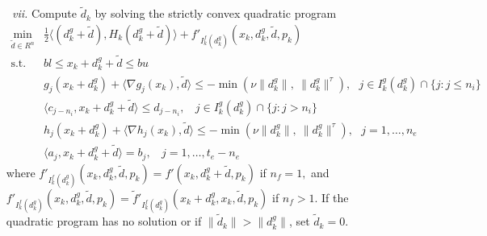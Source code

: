 \begin{itemize}
\item[\it ~vii.] 
Compute $\tilde d_{k}$ by solving the strictly convex 
quadratic program
\smallskip
$$  \begin{array}{cl} \min\limits_{\tilde d \in R^n} &  \frac{1}{2}
                  \langle (d_k^g+\tilde d),H_{k}(d^g_k+\tilde d)\rangle 
                 +f'_{I^f_k(d_k^g)}(x_k,d_k^g,\tilde d,p_k) \\
  \mbox{s.t.} &  bl \leq x_k+d_k^g+\tilde d \leq bu\\
       & g_j(x_k+d_k^g) +\langle \nabla g_j(x_k),\tilde d\rangle\leq
         -\min(\nu\|d_k^g\|,~\|d_k^g\|^{\tau}),
              ~~~j\in I^g_k(d^g_k)\cap\{j:j\leq n_i\}\\
       & \langle c_{j-n_i},x_k+d_k^g + \tilde d \rangle \leq d_{j-n_i},
              ~~~~j\in I^g_k(d^g_k)\cap\{j:j>n_i\}\\
       & h_j(x_k+d_k^g) +\langle \nabla h_j(x_k),\tilde d\rangle\leq
         -\min(\nu\|d_k^g\|,~\|d_k^g\|^{\tau}),
              ~~~j=1,\ldots,n_e\\
       & \langle a_j,x_k+d_k^g + \tilde d \rangle=b_j,
              ~~~~j=1,\ldots,t_e-n_e\end{array}$$
where $f'_{I^f_k(d_k^g)}(x_k,d_k^g,\tilde d,p_k)=f'(x_k,d_k^g+\tilde d,p_k)$ if
 $n_f=1,$
and $f'_{I^f_k(d_k^g)}(x_k,d_k^g,\tilde d,p_k)=
\tilde{f}'_{I^f_k(d_k^g)}(x_k+d_k^g,x_k,\tilde d,p_k)$ 
if $n_f>1$. If the quadratic program has no solution or 
if $\|\tilde d_k\|>\|d_k^g\|$, set $\tilde d_k=0$.


\end{itemize}
